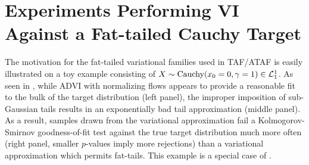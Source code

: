 \documentclass[thesis.tex]{subfiles}
\begin{document}



\section{Experiments Performing VI Against a Fat-tailed Cauchy Target}
\label{sec:cauchy_normal_student}
The motivation for the fat-tailed variational families used in TAF/ATAF
is easily illustrated on a toy example consisting of $X \sim \text{Cauchy}(x_0 = 0, \gamma = 1) \in \mathcal{L}^1_1$.
As seen in , while ADVI with normalizing flows \citep{kingma2016improved,webb2019improving}
appears to provide a reasonable fit to the bulk of the target distribution (left panel), the improper
imposition of sub-Gaussian tails results in an exponentially bad tail approximation (middle panel).
As a result, samples drawn from the variational approximation fail a Kolmogorov-Smirnov goodness-of-fit
test against the true target distribution much more often (right panel, smaller $p$-values imply more rejections)
than a variational approximation which permits fat-tails. This example is a special case of .
\end{document}
